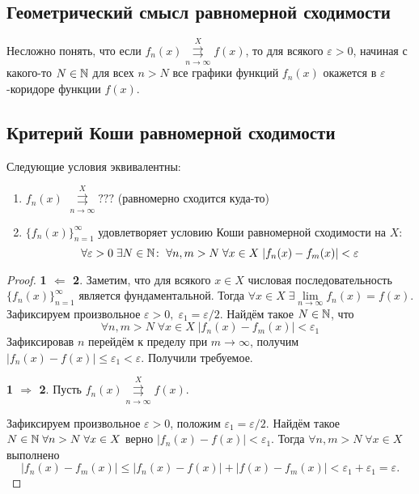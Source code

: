 \documentclass[a4paper, 12pt]{article}
\begin{document}
	\subsection{Геометрический смысл равномерной сходимости}
	Несложно понять, что если $f_n(x) \overset{X}{\underset{n\to\infty}{\rightrightarrows}} f(x)$, то для всякого $\varepsilon > 0$, начиная с какого-то $N\in \mathbb{N}$ для всех $n>N$ все графики функций $f_n(x)$ окажется в $\varepsilon$-коридоре функции $f(x)$.
	\subsection{Критерий Коши равномерной сходимости}
	\begin{Theorem}
		Следующие условия эквивалентны:
		\begin{enumerate}
			\item $f_n(x)$ $\overset{X}{\underset{n\to\infty}{\rightrightarrows}} ???$ (равномерно сходится куда-то)
			\item $\{f_n(x)\}_{n=1}^\infty$ удовлетворяет условию Коши равномерной сходимости на $X$:
			$$
			\forall \varepsilon > 0\; \exists N\in\mathbb{N}\colon \; \forall n,m>N\; \forall x\in X\; |f_n(x) - f_m(x)| < \varepsilon
			$$
		\end{enumerate}
	\end{Theorem}
	\begin{proof}
		\par \textbf{1 $\Leftarrow$ 2}. Заметим, что для всякого $x\in X$ числовая последовательность $\{f_n(x)\}_{n=1}^\infty$ является фундаментальной. Тогда $\forall x\in X\; \exists \lim\limits_{n\to \infty} f_n(x) = f(x)$. Зафиксируем произвольное $\varepsilon > 0,\; \varepsilon_1 = \varepsilon / 2$. Найдём такое $N \in \mathbb{N}$, что 
		$$
			\forall n,m>N\; \forall x\in X\; |f_n(x) - f_m(x)| < \varepsilon_1
		$$
		Зафиксировав $n$ перейдём к пределу при $m \to \infty$, получим $|f_n(x) - f(x)| \leqslant \varepsilon_1 < \varepsilon$. Получили требуемое.
		\par \textbf{1 $\Rightarrow$ 2}. Пусть $f_n(x) \overset{X}{\underset{n\to\infty}{\rightrightarrows}} f(x)$.
		\par Зафиксируем произвольное $\varepsilon > 0$, положим $\varepsilon_1 = \varepsilon / 2$. Найдём такое $N\in \mathbb{N}\; \forall n>N\; \forall x\in X$ верно $ |f_n(x) - f(x)| < \varepsilon_1$. Тогда $\forall n,m > N\; \forall x \in X$ выполнено
		$$
			|f_n(x) - f_m(x)| \leqslant |f_n(x) - f(x)| + |f(x) - f_m(x)| < \varepsilon_1 + \varepsilon_1 = \varepsilon.
		$$
	\end{proof}
\end{document}
